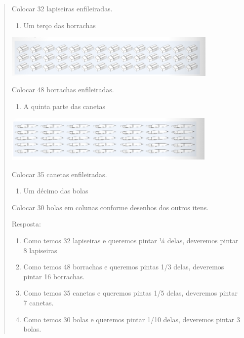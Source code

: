 \begin{enumerate}
\begin{escolha}
\begin{enumerate}
\begin{itemize}
\begin{itemize}
\begin{escolha}
\begin{quote}
\begin{escolha}
{Colocar 32 lapiseiras enfileiradas.

\begin{enumerate}
\def\labelenumi{\alph{enumi})}
\item
  Um terço das borrachas
\end{enumerate}

\includegraphics[width=4.08369in,height=0.81674in]{media/image112.png}

Colocar 48 borrachas enfileiradas.

\begin{enumerate}
\def\labelenumi{\alph{enumi})}
\item
  A quinta parte das canetas
\end{enumerate}

\includegraphics[width=4.06702in,height=0.89174in]{media/image113.png}

Colocar 35 canetas enfileiradas.

\begin{enumerate}
\def\labelenumi{\alph{enumi})}
\item
  Um décimo das bolas
\end{enumerate}

Colocar 30 bolas em colunas conforme desenhos dos outros itens.

Resposta:

\begin{enumerate}
\def\labelenumi{\alph{enumi})}
\item
  Como temos 32 lapiseiras e queremos pintar ¼ delas, deveremos pintar 8
  lapiseiras
\item
  Como temos 48 borrachas e queremos pintas 1/3 delas, deveremos pintar
  16 borrachas.
\item
  Como temos 35 canetas e queremos pintas 1/5 delas, deveremos pintar 7
  canetas.
\item
  Como temos 30 bolas e queremos pintar 1/10 delas, deveremos pintar 3
  bolas.
\end{enumerate}

}
\end{escolha}
\end{quote}
\end{escolha}
\end{itemize}
\end{itemize}
\end{enumerate}
\end{escolha}
\end{enumerate}
